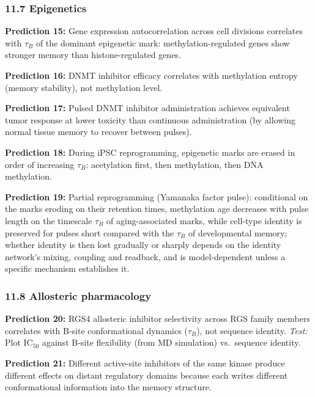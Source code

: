 \documentclass[
]{article}
\begin{document}
\hypertarget{epigenetics}{%
\subsubsection{11.7 Epigenetics}\label{epigenetics}}

\textbf{Prediction 15:} Gene expression autocorrelation across cell
divisions correlates with \(\tau_B\) of the dominant epigenetic mark:
methylation-regulated genes show stronger memory than histone-regulated
genes.

\textbf{Prediction 16:} DNMT inhibitor efficacy correlates with
methylation entropy (memory stability), not methylation level.

\textbf{Prediction 17:} Pulsed DNMT inhibitor administration achieves
equivalent tumor response at lower toxicity than continuous
administration (by allowing normal tissue memory to recover between
pulses).

\textbf{Prediction 18:} During iPSC reprogramming, epigenetic marks are
erased in order of increasing \(\tau_B\): acetylation first, then
methylation, then DNA methylation.

\textbf{Prediction 19:} Partial reprogramming (Yamanaka factor pulse):
conditional on the marks eroding on their retention times, methylation
age decreases with pulse length on the timescale \(\tau_B\) of
aging-associated marks, while cell-type identity is preserved for pulses
short compared with the \(\tau_B\) of developmental memory; whether
identity is then lost gradually or sharply depends on the identity
network's mixing, coupling and readback, and is model-dependent unless a
specific mechanism establishes it.

\hypertarget{allosteric-pharmacology}{%
\subsubsection{11.8 Allosteric
pharmacology}\label{allosteric-pharmacology}}

\textbf{Prediction 20:} RGS4 allosteric inhibitor selectivity across RGS
family members correlates with B-site conformational dynamics
(\(\tau_B\)), not sequence identity. \emph{Test:} Plot IC\(_{50}\)
against B-site flexibility (from MD simulation) vs.~sequence identity.

\textbf{Prediction 21:} Different active-site inhibitors of the same
kinase produce different effects on distant regulatory domains because
each writes different conformational information into the memory
structure.
\end{document}
